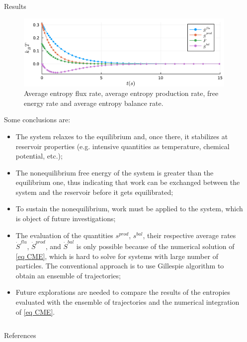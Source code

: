 \documentclass[final]{beamer}
\newlength{\sepwidth}
\newlength{\colwidth}
\newcommand{\separatorcolumn}{\begin{column}{\sepwidth}\end{column}}
\begin{document}
\begin{frame}[t]
\begin{columns}[t]
\begin{column}{\colwidth}
\begin{block}{Results}
\begin{figure}
\begin{center}
%
\includegraphics[scale=1.2]{graphics/f2.pdf}
\end{center}
\label{fig 2-state-system}
\caption{\justifying Average entropy flux rate, average entropy production rate, free energy rate and average entropy balance rate.}
\end{figure}

Some conclusions are:
%
\begin{itemize}
\justifying
\item The system relaxes to the equilibrium and, once there, it stabilizes at reservoir properties (e.g. intensive quantities as temperature, chemical potential, etc.);
\item The nonequilibrium free energy of the system is greater than the equilibrium one, thus indicating that work can be exchanged between the system and the reservoir before it gets equilibrated;
\item To sustain the nonequilibrium, work must be applied to the system, which is object of future investigations;
\item The evaluation of the quantities $s^{prod}$, $s^{bal}$, their respective average rates $\dot{S}^{flu}$, $\dot{S}^{prod}$, and $\dot{S}^{bal}$ is only possible because of the numerical solution of \eqref{eq CME}, which is hard to solve for systems with large number of particles. The conventional approach is to use Gillespie algorithm to obtain an ensemble of trajectories;
\item Future explorations are needed to compare the results of the entropies evaluated with the ensemble of trajectories and the numerical integration of \eqref{eq CME}.
\end{itemize}


\end{block}
\end{column}

\separatorcolumn
\end{columns}
\begin{alertblock}{References}

\begin{minipage}[t][5cm][t]{\textwidth}
\begin{multicols}{3}
\footnotesize{
}
\end{multicols}
\end{minipage}

\end{alertblock}
 \end{frame}
\end{document}
